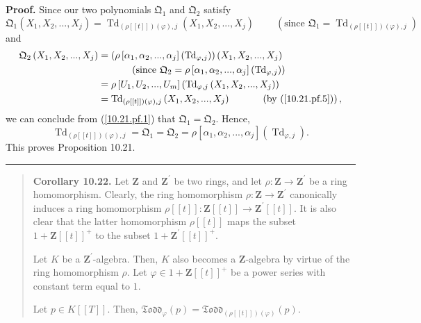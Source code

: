 \documentclass[numbers=enddot,12pt,final,onecolumn,notitlepage]{scrartcl}%
\newenvironment{proof}[1][Proof]{\noindent\textbf{#1.} }{\ \rule{0.5em}{0.5em}}
\begin{document}
\begin{proof}
Since our two polynomials $\mathfrak{Q}_{1}$ and $\mathfrak{Q}_{2}$ satisfy%
\[
\mathfrak{Q}_{1}\left(  X_{1},X_{2},...,X_{j}\right)  =\operatorname*{Td}%
\nolimits_{\left(  \rho\left[  \left[  t\right]  \right]  \right)  \left(
\varphi\right)  ,j}\left(  X_{1},X_{2},...,X_{j}\right)
\ \ \ \ \ \ \ \ \ \ \left(  \text{since }\mathfrak{Q}_{1}=\operatorname*{Td}%
\nolimits_{\left(  \rho\left[  \left[  t\right]  \right]  \right)  \left(
\varphi\right)  ,j}\right)
\]
and%
\begin{align*}
\mathfrak{Q}_{2}\left(  X_{1},X_{2},...,X_{j}\right)   &  =\left(  \rho\left[
\alpha_{1},\alpha_{2},...,\alpha_{j}\right]  \left(  \operatorname*{Td}%
\nolimits_{\varphi,j}\right)  \right)  \left(  X_{1},X_{2},...,X_{j}\right) \\
&  \ \ \ \ \ \ \ \ \ \ \left(  \text{since }\mathfrak{Q}_{2}=\rho\left[
\alpha_{1},\alpha_{2},...,\alpha_{j}\right]  \left(  \operatorname*{Td}%
\nolimits_{\varphi,j}\right)  \right) \\
&  =\rho\left[  U_{1},U_{2},...,U_{m}\right]  \left(  \operatorname*{Td}%
\nolimits_{\varphi,j}\left(  X_{1},X_{2},...,X_{j}\right)  \right) \\
&  =\operatorname*{Td}\nolimits_{\left(  \rho\left[  \left[  t\right]
\right]  \right)  \left(  \varphi\right)  ,j}\left(  X_{1},X_{2}%
,...,X_{j}\right)  \ \ \ \ \ \ \ \ \ \ \left(  \text{by (\ref{10.21.pf.5}%
)}\right)  ,
\end{align*}
we can conclude from (\ref{10.21.pf.1}) that $\mathfrak{Q}_{1}=\mathfrak{Q}%
_{2}$. Hence,%
\[
\operatorname*{Td}\nolimits_{\left(  \rho\left[  \left[  t\right]  \right]
\right)  \left(  \varphi\right)  ,j}=\mathfrak{Q}_{1}=\mathfrak{Q}_{2}%
=\rho\left[  \alpha_{1},\alpha_{2},...,\alpha_{j}\right]  \left(
\operatorname*{Td}\nolimits_{\varphi,j}\right)  .
\]
This proves Proposition 10.21.
\end{proof}

\begin{quote}
\textbf{Corollary 10.22.} Let $\mathbf{Z}$ and $\mathbf{Z}^{\prime}$ be two
rings, and let $\rho:\mathbf{Z}\rightarrow\mathbf{Z}^{\prime}$ be a ring
homomorphism. Clearly, the ring homomorphism $\rho:\mathbf{Z}\rightarrow
\mathbf{Z}^{\prime}$ canonically induces a ring homomorphism $\rho\left[
\left[  t\right]  \right]  :\mathbf{Z}\left[  \left[  t\right]  \right]
\rightarrow\mathbf{Z}^{\prime}\left[  \left[  t\right]  \right]  $. It is also
clear that the latter homomorphism $\rho\left[  \left[  t\right]  \right]  $
maps the subset $1+\mathbf{Z}\left[  \left[  t\right]  \right]  ^{+}$ to the
subset $1+\mathbf{Z}^{\prime}\left[  \left[  t\right]  \right]  ^{+}$.

Let $K$ be a $\mathbf{Z}^{\prime}$-algebra. Then, $K$ also becomes a
$\mathbf{Z}$-algebra by virtue of the ring homomorphism $\rho$. Let
$\varphi\in1+\mathbf{Z}\left[  \left[  t\right]  \right]  ^{+}$ be a power
series with constant term equal to $1$.

Let $p\in K\left[  \left[  T\right]  \right]  $. Then, $\mathfrak{Todd}%
_{\varphi}\left(  p\right)  =\mathfrak{Todd}_{\left(  \rho\left[  \left[
t\right]  \right]  \right)  \left(  \varphi\right)  }\left(  p\right)  $.
\end{quote}
\end{document}
